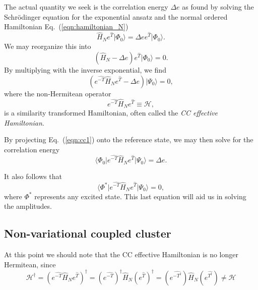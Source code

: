 The actual quantity we seek is the correlation energy $\Delta e$ as
found by solving the Schrödinger equation for the exponential ansatz
and the normal ordered Hamiltonian Eq.~(\ref{eqn:hamiltonian_N})
\begin{equation}
\hat{H}_N e^{\hat{T}} \vert \Phi_0 \rangle =  \Delta e  e^{\hat{T}} \vert \Phi_0 \rangle.
\end{equation}
We may reorganize this into
\begin{equation}
(\hat{H}_N - \Delta e) e^{\hat{T}} \vert \Phi_0 \rangle = 0.
\end{equation}
By multiplying with the inverse exponential, we find
\begin{equation}
(e^{\hat{-T}} \hat{H}_N e^{\hat{T}} - \Delta e)  \vert \Psi_0 \rangle = 0,
\label{eqn:cc1}
\end{equation}
where the non-Hermitean operator
\begin{equation}
e^{\hat{-T}} \hat{H}_N e^{\hat{T}}  \equiv \mathcal{H},
\end{equation}
is a similarity transformed Hamiltonian, often called the \emph{CC effective Hamiltonian}.

By projecting Eq.~(\ref{eqn:cc1}) onto the reference state, we may then solve for the correlation energy
\begin{equation}
\langle \Phi_0 \vert e^{\hat{-T}} \hat{H}_N e^{\hat{T}} \vert \Psi_0 \rangle = \Delta e.
\label{eqn:cc2}
\end{equation}

It also follows that
\begin{equation}
\langle \Phi^* \vert e^{\hat{-T}} \hat{H}_N e^{\hat{T}} \vert \Psi_0 \rangle = 0,
\label{eqn:cc2}
\end{equation}
where $\Phi^*$ represents any excited state. This last equation will aid us in solving the amplitudes.

\subsection{Non-variational coupled cluster}

At this point we should note that the CC effective Hamiltonian is no longer Hermitean, since
\begin{equation}
\mathcal{H}^\dagger = (e^{\hat{-T}} \hat{H}_N e^{\hat{T}})^\dagger = (e^{\hat{-T}})^\dagger \hat{H}_N (e^{\hat{T}})^\dagger = (e^{\hat{-T^\dagger}}) \hat{H}_N (e^{\hat{T^\dagger}}) \neq \mathcal{H}
\end{equation}

